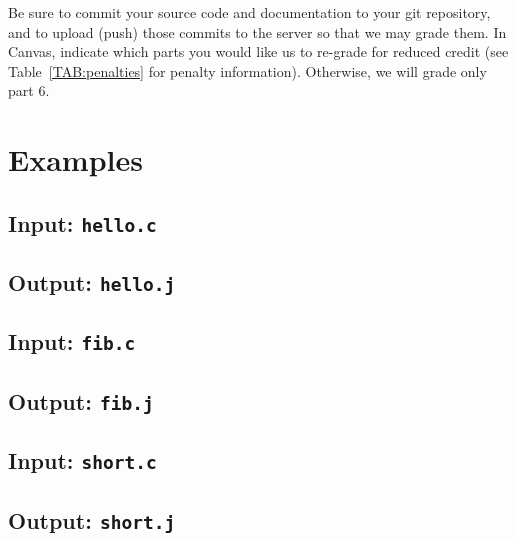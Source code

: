 \documentclass{article}
\newcommand{\flowgen}{6}
\begin{document}
Be sure to commit your source code and documentation to your
git repository, and to upload (push) those commits to the server
so that we may grade them.
In Canvas,
indicate which parts you would like us to re-grade for reduced credit
(see Table~\ref{TAB:penalties} for penalty information).
Otherwise, we will grade only part \flowgen{}.

\section{Examples} \label{SEC:examples}

\subsection{Input: {\tt hello.c}}



\subsection{Output: {\tt hello.j}}



\subsection{Input: {\tt fib.c}}



\subsection{Output: {\tt fib.j}}



\subsection{Input: {\tt short.c}}



\subsection{Output: {\tt short.j}}


\end{document}
